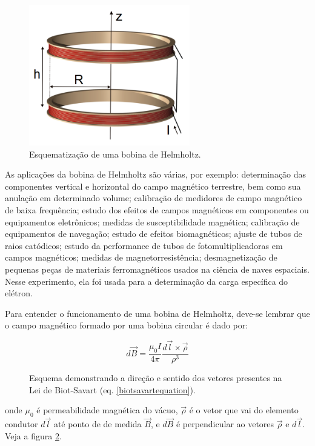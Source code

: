 \documentclass{article}
\begin{document}
\begin{figure}
    \centering
    \includegraphics[width=7cm]{./Imagens/Helmholtz.png}
    \caption{Esquematização de uma bobina de Helmholtz. }
    \label{helmholtz}
\end{figure}

As aplicações da bobina de Helmholtz são várias, por exemplo: determinação das componentes vertical e horizontal do campo magnético terrestre, bem como sua anulação em determinado volume; calibração de medidores de campo magnético de baixa frequência; estudo dos efeitos de campos magnéticos em componentes ou equipamentos eletrônicos; medidas de susceptibilidade magnética; calibração de equipamentos de navegação; estudo de efeitos biomagnéticos; ajuste de tubos de raios catódicos; estudo da performance de tubos de fotomultiplicadoras em campos magnéticos; medidas de magnetorresistência; desmagnetização de pequenas peças de materiais ferromagnéticos usados na ciência de naves espaciais. Nesse experimento, ela foi usada para a determinação da carga específica do elétron.

Para entender o funcionamento de uma bobina de Helmholtz, deve-se lembrar que o campo magnético formado por uma bobina circular é dado por:

\begin{equation}
    \label{biotsavartequation}
    d \vec B =  \frac{\mu _0 I}{4 \pi} \frac{d \vec l \times \vec \rho} {\rho ^3}
\end{equation}
\begin{figure}
    \centering
    
    \caption{Esquema demonstrando a direção e sentido dos vetores presentes na Lei de Biot-Savart (eq. \ref{biotsavartequation}). }
    \label{biotsvartimage}
\end{figure}
onde $\mu _0$ é permeabilidade magnética do vácuo, $\vec \rho$ é o vetor que vai do elemento condutor $d \vec l$ até ponto de de medida $\vec B$, e $d \vec B$ é perpendicular ao vetores $\vec \rho$ e $d \vec l$. Veja a figura \ref{biotsvartimage}.
\end{document}
